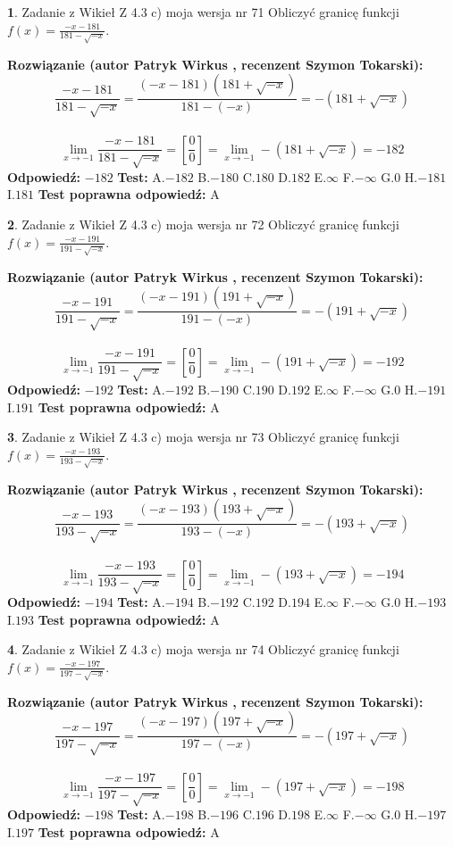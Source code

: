 \documentclass[12pt, a4paper]{article}
\theoremstyle{definition} %
\newtheorem{zad}{}
\newcommand{\zadStart}[1]{\begin{zad}#1\newline}
\newcommand{\zadStop}{\end{zad}}
\newcommand{\rozwStart}[2]{\noindent \textbf{Rozwiązanie (autor #1 , recenzent #2): }\newline}
\newcommand{\rozwStop}{\newline}
\newcommand{\odpStart}{\noindent \textbf{Odpowiedź:}\newline}
\newcommand{\odpStop}{\newline}
\newcommand{\testStart}{\noindent \textbf{Test:}\newline}
\newcommand{\testStop}{\newline}
\newcommand{\kluczStart}{\noindent \textbf{Test poprawna odpowiedź:}\newline}
\newcommand{\kluczStop}{\newline}
\begin{document}
\zadStart{Zadanie z Wikieł Z 4.3 c) moja wersja nr 71}
Obliczyć granicę funkcji $f(x)=\frac{-x-181}{181-\sqrt{-x}}$.
\zadStop
\rozwStart{Patryk Wirkus}{Szymon Tokarski}
$$\frac{-x-181}{181-\sqrt{-x}}=\frac{(-x-181)(181+\sqrt{-x})}{181-(-x)}=-(181+\sqrt{-x})$$
\\
$$\lim\limits_{x\to-1}\frac{-x-181}{181-\sqrt{-x}}=[\frac{0}{0}]=\lim\limits_{x\to-1}-(181+\sqrt{-x}) =-182$$
\rozwStop
\odpStart
$-182$
\odpStop
\testStart
A.$-182$
B.$-180$
C.$180$
D.$182$
E.$\infty$
F.$-\infty$
G.$0$
H.$-181$
I.$181$
\testStop
\kluczStart
A
\kluczStop



\zadStart{Zadanie z Wikieł Z 4.3 c) moja wersja nr 72}
Obliczyć granicę funkcji $f(x)=\frac{-x-191}{191-\sqrt{-x}}$.
\zadStop
\rozwStart{Patryk Wirkus}{Szymon Tokarski}
$$\frac{-x-191}{191-\sqrt{-x}}=\frac{(-x-191)(191+\sqrt{-x})}{191-(-x)}=-(191+\sqrt{-x})$$
\\
$$\lim\limits_{x\to-1}\frac{-x-191}{191-\sqrt{-x}}=[\frac{0}{0}]=\lim\limits_{x\to-1}-(191+\sqrt{-x}) =-192$$
\rozwStop
\odpStart
$-192$
\odpStop
\testStart
A.$-192$
B.$-190$
C.$190$
D.$192$
E.$\infty$
F.$-\infty$
G.$0$
H.$-191$
I.$191$
\testStop
\kluczStart
A
\kluczStop



\zadStart{Zadanie z Wikieł Z 4.3 c) moja wersja nr 73}
Obliczyć granicę funkcji $f(x)=\frac{-x-193}{193-\sqrt{-x}}$.
\zadStop
\rozwStart{Patryk Wirkus}{Szymon Tokarski}
$$\frac{-x-193}{193-\sqrt{-x}}=\frac{(-x-193)(193+\sqrt{-x})}{193-(-x)}=-(193+\sqrt{-x})$$
\\
$$\lim\limits_{x\to-1}\frac{-x-193}{193-\sqrt{-x}}=[\frac{0}{0}]=\lim\limits_{x\to-1}-(193+\sqrt{-x}) =-194$$
\rozwStop
\odpStart
$-194$
\odpStop
\testStart
A.$-194$
B.$-192$
C.$192$
D.$194$
E.$\infty$
F.$-\infty$
G.$0$
H.$-193$
I.$193$
\testStop
\kluczStart
A
\kluczStop



\zadStart{Zadanie z Wikieł Z 4.3 c) moja wersja nr 74}
Obliczyć granicę funkcji $f(x)=\frac{-x-197}{197-\sqrt{-x}}$.
\zadStop
\rozwStart{Patryk Wirkus}{Szymon Tokarski}
$$\frac{-x-197}{197-\sqrt{-x}}=\frac{(-x-197)(197+\sqrt{-x})}{197-(-x)}=-(197+\sqrt{-x})$$
\\
$$\lim\limits_{x\to-1}\frac{-x-197}{197-\sqrt{-x}}=[\frac{0}{0}]=\lim\limits_{x\to-1}-(197+\sqrt{-x}) =-198$$
\rozwStop
\odpStart
$-198$
\odpStop
\testStart
A.$-198$
B.$-196$
C.$196$
D.$198$
E.$\infty$
F.$-\infty$
G.$0$
H.$-197$
I.$197$
\testStop
\kluczStart
A
\kluczStop
\end{document}
